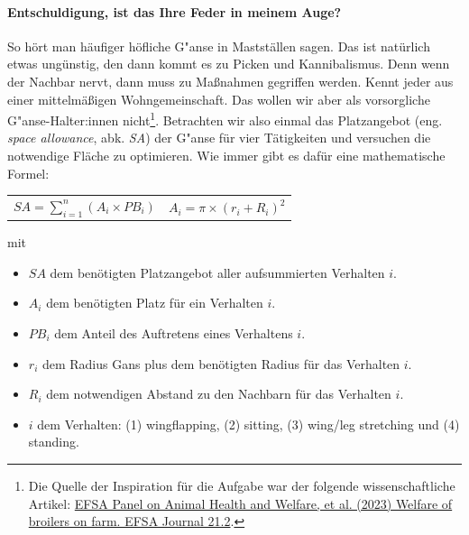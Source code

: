 \documentclass[a4paper, 9pt]{scrartcl}\usepackage[]{graphicx}\usepackage[]{xcolor}
\begin{document}
\paragraph{Entschuldigung,  ist das Ihre Feder in meinem Auge?}



So h{\"o}rt man h{\"a}ufiger h{\"o}fliche G{"a}nse in Mastst{\"a}llen sagen. Das
ist nat{\"u}rlich etwas ung{\"u}nstig, den dann kommt es zu Picken und
Kannibalismus. Denn wenn der Nachbar nervt, dann muss zu Ma{\ss}nahmen
gegriffen werden. Kennt jeder aus einer mittelm{\"a}{\ss}igen Wohngemeinschaft. Das
wollen wir aber als vorsorgliche G{"a}nse-Halter:innen
nicht\footnote{Die Quelle der Inspiration f{\"u}r die Aufgabe war der folgende
  wissenschaftliche Artikel:
  \href{https://www.efsa.europa.eu/en/efsajournal/pub/7788}{EFSA Panel on
    Animal Health and Welfare, et al. (2023) Welfare of broilers on
    farm. EFSA Journal 21.2}.}. Betrachten wir also einmal das Platzangebot
(eng. \textit{space allowance}, abk. \textit{SA}) der G{"a}nse
f{\"u}r vier T{\"a}tigkeiten und versuchen die notwendige Fl{\"a}che zu optimieren. Wie
immer gibt es daf{\"u}r eine mathematische Formel:


\begin{center}
  \begin{tabular}{cc}
    $SA = \sum^n_{i = 1} (A_i \times PB_i)$ & $A_i = \pi \times (r_i + R_i)^2$\\
  \end{tabular}
\end{center}

\vspace{-2Ex}

mit

\begin{itemize}[noitemsep]
\item $SA$ dem ben{\"o}tigten Platzangebot aller aufsummierten Verhalten $i$.
\item $A_i$ dem ben{\"o}tigten Platz f{\"u}r ein Verhalten $i$. 
\item $PB_i$ dem Anteil des Auftretens eines Verhaltens $i$.
\item $r_i$ dem Radius Gans plus dem ben{\"o}tigten Radius f{\"u}r das Verhalten $i$.
\item $R_i$ dem notwendigen Abstand zu den Nachbarn f{\"u}r das Verhalten $i$.    
\item $i$ dem Verhalten: (1) wingflapping, (2) sitting, (3)
  wing/leg stretching und (4) standing.
\end{itemize}
\end{document}
